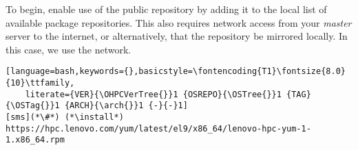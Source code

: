 To begin, enable use of the public \Confluent{} repository by adding it to the local list
of available package repositories. This also requires network access from
your {\em master} server to the internet, or alternatively, that
the repository be mirrored locally. In this case, we use the network.

\begin{lstlisting}[language=bash,keywords={},basicstyle=\fontencoding{T1}\fontsize{8.0}{10}\ttfamily,
	literate={VER}{\OHPCVerTree{}}1 {OSREPO}{\OSTree{}}1 {TAG}{\OSTag{}}1 {ARCH}{\arch{}}1 {-}{-}1]
[sms](*\#*) (*\install*) https://hpc.lenovo.com/yum/latest/el9/x86_64/lenovo-hpc-yum-1-1.x86_64.rpm
\end{lstlisting}
